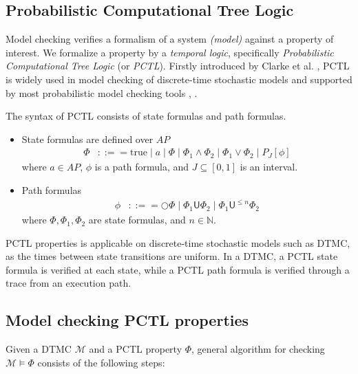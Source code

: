 \subsection{Probabilistic Computational Tree Logic}
Model checking verifies a formalism of a system \textit{(model)} against a property of interest. We
formalize a property by a \textit{temporal logic}, specifically \textit{Probabilistic Computational
    Tree Logic} (or \textit{PCTL}). Firstly introduced by Clarke et al. \cite{clarke1986automatic}, PCTL
is widely used in model checking of discrete-time stochastic models and supported by most
probabilistic model checking tools \cite{dehnert2017storm}, \cite{kwiatkowska2011prism}.
\begin{definition}[PCTL] The syntax of PCTL consists of state formulas and path formulas.
    \begin{itemize}
        \item State formulas are defined over $AP$
              \begin{align*}
                  \Phi & ::== \text{true} \;|\; a \;|\; \Phi \;|\; \Phi_1 \wedge \Phi_2 \;|\; \Phi_1 \vee \Phi_2 \;|\;  P_{J}[\phi]
              \end{align*}
              where $a\in AP$, $\phi$ is a path formula, and $J\subseteq[0,1]$ is an interval.
        \item Path formulas
              \begin{align*}
                  \phi & ::== \bigcirc \Phi \;|\; \Phi_1 \mathsf{U} \Phi_2 \;|\; \Phi_1 \mathsf{U}^{\leq n} \Phi_2
              \end{align*}
              where $\Phi,\Phi_1,\Phi_2$ are state formulas, and $n\in \mathbb{N}$.
    \end{itemize}
\end{definition}
PCTL properties is applicable on discrete-time stochastic models such as DTMC, as the times between
state transitions are uniform. In a DTMC, a PCTL state formula is verified at each state, while a
PCTL path formula is verified through a trace from an execution path.
\begin{example}

\end{example}

\subsection{Model checking PCTL properties}
Given a DTMC $\mathcal{M}$ and a PCTL property $\Phi$, general algorithm for checking
$\mathcal{M}\models\Phi$ consists of the following steps:

